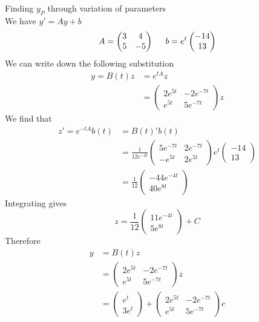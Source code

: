 \documentclass[journal, letterpaper]{IEEEtran}
\begin{document}
    \begin{myboxg}{Finding $y_P$ through variation of parameters} \\
        We have $y' = Ay + b$
        $$ A = \begin{pmatrix}
            3 & 4 \\ 5 & -5
        \end{pmatrix} \hspace{0.5cm} b = e^t\begin{pmatrix}
            -14 \\ 13
        \end{pmatrix}$$
        We can write down the following substitution
        \begin{align*}
        y = B(t)z &= e^{tA}z \\
        &= \begin{pmatrix}
            2e^{5t} & -2e^{-7t} \\
            e^{5t} & 5e^{-7t}
        \end{pmatrix}z
        \end{align*}
        We find that
        \begin{align*}
            z' = e^{-tA}b(t) &= B(t)'b(t) \\ 
            &= \frac{1}{12e^{-2t}}\begin{pmatrix}
                5e^{-7t} & 2e^{-7t} \\
                -e^{5t} & 2e^{5t}
            \end{pmatrix}e^t \begin{pmatrix}
                -14 \\ 13
            \end{pmatrix} \\ 
            &= \frac{1}{12}\begin{pmatrix}
                -44e^{-4t} \\ 40e^{8t}
            \end{pmatrix}
        \end{align*}
        Integrating gives
        $$ z = \frac{1}{12}\begin{pmatrix}
            11e^{-4t} \\ 
            5e^{8t}
        \end{pmatrix} + C$$
        Therefore
        \begin{align*}
            y &= B(t)z \\ 
            &= \begin{pmatrix}
                2e^{5t} & -2e^{-7t} \\
                e^{5t} & 5e^{-7t}
            \end{pmatrix}z \\
            &= \begin{pmatrix}
                e^t \\ 3e^t
            \end{pmatrix} + \begin{pmatrix}
                2e^{5t} & -2e^{-7t} \\
                e^{5t} & 5e^{-7t}
            \end{pmatrix}c
        \end{align*}
    \end{myboxg}
\end{document}
